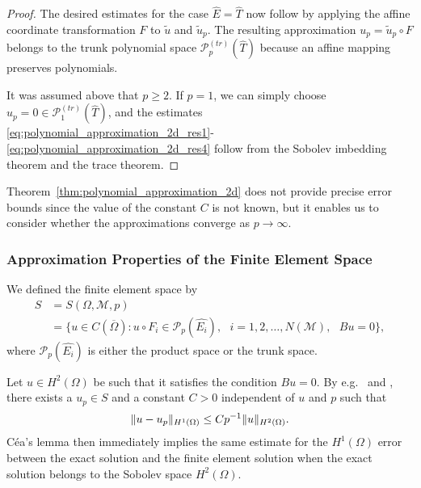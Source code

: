 \documentclass[english, 12pt, a4paper, sci, utf8, a-2b, online]{aaltothesis}
\theoremstyle{definition}
\theoremstyle{plain}
\DeclarePairedDelimiter\norm{\lVert}{\rVert}
\numberwithin{equation}{section}
\begin{document}
\begin{proof}
    The desired estimates for the case $\widehat{E} = \widehat{T}$
    now follow by applying the affine coordinate transformation $F$
    to $\tilde{u}$ and $\tilde{u}_p$.
    The resulting approximation $u_p = \tilde{u}_p \circ F$
    belongs to the trunk polynomial space $\mathcal{P}_p^{(tr)}(\widehat{T})$
    because an affine mapping preserves polynomials.

    It was assumed above that $p \geq 2$.
    If $p=1$, we can simply choose
    $u_p = 0 \in \mathcal{P}_{1}^{(tr)}(\widehat{T})$, and the estimates
    \eqref{eq:polynomial_approximation_2d_res1}-\eqref{eq:polynomial_approximation_2d_res4}
    follow from the Sobolev imbedding theorem and the trace theorem.
\end{proof}

Theorem~\ref{thm:polynomial_approximation_2d} does not provide precise error bounds
since the value of the constant $C$ is not known,
but it enables us to consider whether the approximations converge as $p \to \infty$.

\subsubsection{Approximation Properties of the Finite Element Space}
\label{subsubsec:approximation_properties_of_the_finite_element_space}

We defined the finite element space by
\begin{align*}
    S
    &= S(\Omega, \mathcal{M}, p) \\
    &= \{
        u \in C(\overline{\Omega})
            : u \circ F_i \in \mathcal{P}_p(\widehat{E_i}),
                \text{ } i=1,2,\dotsc,N(\mathcal{M}),
                    \text{ } Bu = 0
    \},
\end{align*}
where $\mathcal{P}_p(\widehat{E_i})$ is either the product space or the trunk space.

Let $u \in H^2(\Omega)$ be such that it satisfies the condition $Bu = 0$.
By e.g.\ \cite{babuskasuri1987} and \cite{babuskasuri1987hp},
there exists a $u_p \in S$ and a constant $C > 0$ independent of $u$ and $p$ such that
\begin{equation}
    \label{eq:fem_conv_goal1}
    \norm{u-u_p}_{H^1(\Omega)} \leq C p^{-1} \norm{u}_{H^2(\Omega)}.
\end{equation}
Céa's lemma then immediately implies the same estimate
for the $H^1(\Omega)$ error between the exact solution
and the finite element solution when the exact solution belongs to the Sobolev space $H^2(\Omega)$.
\end{document}
